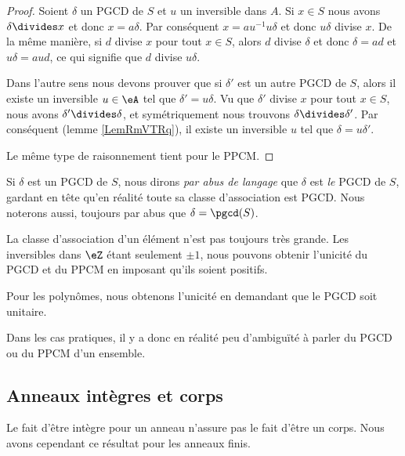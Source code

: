 \begin{proof}
    Soient \( \delta\) un PGCD de \( S\) et \( u\) un inversible dans \( A\). Si \( x\in S\) nous avons \( \delta\divides x\) et donc \( x=a\delta\). Par conséquent \( x=au^{-1}u\delta\) et donc \( u\delta\) divise \( x\). De la même manière, si \( d\) divise \( x\) pour tout \( x\in S\), alors \( d\) divise \( \delta\) et donc \( \delta=ad\) et \( u\delta=aud\), ce qui signifie que \( d\) divise \( u\delta\).

    Dans l'autre sens nous devons prouver que si \( \delta'\) est un autre PGCD de \( S\), alors il existe un inversible \( u\in \eA\) tel que \( \delta'=u\delta\). Vu que \( \delta'\) divise \( x\) pour tout \( x\in S\), nous avons \( \delta'\divides \delta\), et symétriquement nous trouvons \( \delta\divides\delta'\). Par conséquent (lemme \ref{LemRmVTRq}), il existe un inversible \( u\) tel que \( \delta=u\delta'\).

    Le même type de raisonnement tient pour le PPCM.
\end{proof}

Si \( \delta\) est un PGCD de \( S\), nous dirons \emph{par abus de langage} que \( \delta\) est \emph{le} PGCD de \( S\), gardant en tête qu'en réalité toute sa classe d'association est PGCD. Nous noterons aussi, toujours par abus que \( \delta=\pgcd(S)\).

\begin{remark}
    La classe d'association d'un élément n'est pas toujours très grande. Les inversibles dans \( \eZ\) étant seulement \( \pm 1\), nous pouvons obtenir l'unicité du PGCD et du PPCM en imposant qu'ils soient positifs.

    Pour les polynômes, nous obtenons l'unicité en demandant que le PGCD soit unitaire.

    Dans les cas pratiques, il y a donc en réalité peu d'ambiguïté à parler du PGCD ou du PPCM d'un ensemble.
\end{remark}


\subsection{Anneaux intègres et corps}


Le fait d'être intègre pour un anneau n'assure pas le fait d'être un corps. Nous avons cependant ce résultat pour les anneaux finis.

